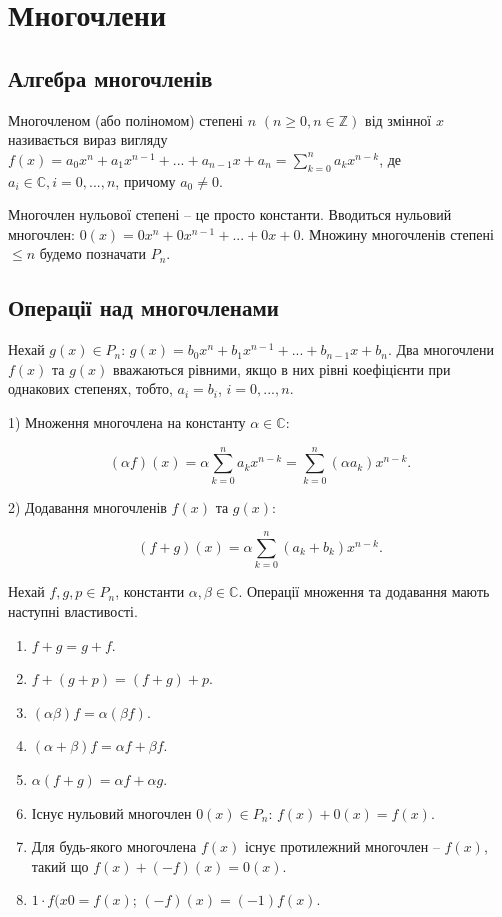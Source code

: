 \section{Многочлени}


\subsection{Алгебра многочленів}

\begin{definition}[Поліномом]
    Многочленом (або поліномом) степені $n$ $(n \geqslant 0, n \in \mathbb{Z})$ від змінної $x$
    називається вираз вигляду $f(x) = a_0x^n + a_1x^{n-1} + ... + a_{n-1}x + a_n = \sum\limits_{k = 0}^n a_kx^{n-k}$, де
    $a_i \in \mathbb{C}, i = 0, ..., n$, причому $a_0 \neq 0$.
\end{definition}

Многочлен нульової степені -- це просто константи. Вводиться нульовий
многочлен: $0(x) = 0x^n + 0x^{n-1} + ... + 0x + 0$. Множину многочленів
степені $\leqslant n$ будемо позначати $P_n$.

\subsection{Операції над многочленами}

Нехай $g(x) \in P_n$: $g(x) = b_0x^n + b_1x^{n-1} + ... + b_{n-1}x + b_n$. Два
многочлени $f(x)$ та $g(x)$ вважаються рівними, якщо в них рівні коефіцієнти при
однакових степенях, тобто, $a_i = b_i$, $i = 0, ..., n$.


1) Множення многочлена на константу $\alpha \in \mathbb{C}$:

$$(\alpha f)(x) = \alpha\sum\limits_{k=0}^n a_k x^{n-k} = \sum\limits_{k=0}^n (\alpha a_k) x^{n-k}.$$

2) Додавання многочленів $f(x)$ та $g(x)$:

$$(f + g)(x) = \alpha\sum\limits_{k=0}^n (a_k+b_k)x^{n-k}.$$

Нехай $f, g, p \in P_n$, константи $\alpha, \beta \in \mathbb{C}$. Операції множення та додавання
мають наступні властивості.
 
\begin{enumerate}
    \item $f + g = g + f$.
    \item $f + (g + p) = (f + g) + p$.
    \item $(\alpha\beta)f = \alpha(\beta f)$.
    \item $(\alpha + \beta)f = \alpha f + \beta f$.
    \item $\alpha(f + g) = \alpha f + \alpha g$.
    \item Існує нульовий многочлен $0(x) \in P_n$: $f(x) + 0(x) = f(x)$.
    \item Для будь-якого многочлена $f(x)$ існує протилежний многочлен -- $f(x)$, такий що $f(x) + (-f)(x) = 0(x)$.
    \item $1 \cdot f(x0 = f(x)$; $(-f)(x) = (-1)f(x)$.
\end{enumerate}

